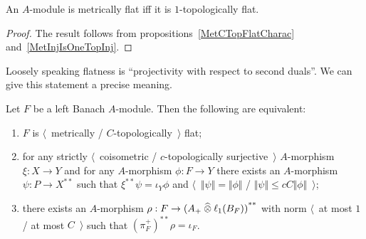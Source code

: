 \begin{proposition}\label{MetFlatIsOneTopFlat} An $A$-module is metrically flat
iff it is $1$-topologically flat.
\end{proposition}
\begin{proof} The result follows from propositions~\ref{MetCTopFlatCharac}
and~\ref{MetInjIsOneTopInj}.
\end{proof}

Loosely speaking flatness is ``projectivity with respect to second duals''. 
We can give this statement a precise meaning.

\begin{proposition}\label{MetTopFlatSecondDualCharac} Let $F$ be a left Banach
$A$-module. Then the following are equivalent:

\begin{enumerate}[label = (\roman*)]
    \item $F$ is $\langle$~metrically / $C$-topologically~$\rangle$ flat;

    \item for any strictly $\langle$~coisometric / $c$-topologically
    surjective~$\rangle$ $A$-morphism $\xi:X\to Y$ and for any $A$-morphism
    $\phi:F\to Y$ there exists an $A$-morphism $\psi:P\to X^{**}$ such that
    $\xi^{**}\psi=\iota_Y\phi$ and $\langle$~$\Vert\psi\Vert=\Vert\phi\Vert$ /
    $\Vert\psi\Vert\leq cC\Vert\phi\Vert$~$\rangle$;

    \item there exists an $A$-morphism $\rho:F\to {(A_+\mathbin{\widehat{\otimes}}\ell_1(B_F))}^{**}$ with norm $\langle$~at most $1$ / at most $C$~$\rangle$
    such that ${(\pi_F^+)}^{**}\rho=\iota_F$.
\end{enumerate}
\end{proposition}
